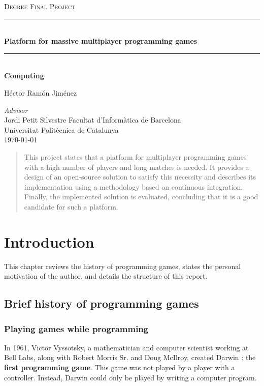 \documentclass[a4paper,11pt,titlepage,abstract,numbers=noenddot,automark,mnsy,intlimits,rgb,dvipsnames]{report}
\begin{document}
\begin{titlepage}
\begin{center}
\textsc{\Large Degree Final Project}
\\[1.5cm]
\rule{\linewidth}{0.5mm}
\\[0.4cm]
{\huge
\bfseries
Platform for massive multiplayer programming games
\\[0.4cm]
}
\rule{\linewidth}{0.5mm}
\\[0.3cm]
{\bfseries
Computing
}
\\[2.5cm]
\begin{center}
\large
Héctor Ramón Jiménez
\end{center}
{\small \emph{Advisor}}\\Jordi Petit Silvestre
\vfill
{\large
Facultat d'Informàtica de Barcelona\\\small Universitat Politècnica de Catalunya
}
\\[0.5cm]
{\large
\today
}
\end{center}
\end{titlepage}
\clearpage
\begin{abstract}
This project states that a platform for multiplayer programming games with a high
  number of players and long matches is needed. It provides a design of an open-source solution to satisfy this necessity
  and describes its implementation using a methodology based on continuous integration. Finally, the implemented solution
  is evaluated, concluding that it is a good candidate for such a platform.
\end{abstract}
\clearpage
\tableofcontents
\clearpage
\chapter{Introduction}
This chapter reviews the history of programming games, states the
personal motivation of the author, and details the structure of this report.
\section{Brief history of programming games}
\subsection{Playing games while programming}
In 1961, Victor Vyssotsky, a mathematician and computer scientist working at Bell Labs, along with Robert Morris Sr. and 
Doug McIlroy, created Darwin \cite{darwin}: the \textbf{first programming game}. This game was not played by a player with a controller.
Instead, Darwin could only be played by writing a computer program.
\end{document}
